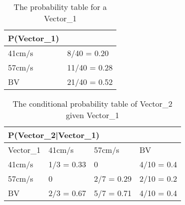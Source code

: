 \begin{table}[H]
\centering
\begin{tabular}{|l|l|}
\hline
P(Vector\_1) &\\ \hline
41cm/s & 8/40 = 0.20   \\ \hline 
57cm/s & 11/40 = 0.28  \\ \hline
BV & 21/40 = 0.52  \\ \hline
\end{tabular}
\caption{The probability table for a Vector\_1}
\label{Vector0Table}
\end{table}

\begin{table}[]
\centering
\begin{tabular}{|l|l|l|l|}
\hline
\multicolumn{4}{|l|}{P(Vector\_2|Vector\_1)} \\ \hline
 Vector\_1 & 41cm/s    & 57cm/s    & BV    \\ \hline
 41cm/s    & 1/3 = 0.33 & 0     & 4/10 = 0.4    \\ \hline
 57cm/s    & 0          & 2/7 = 0.29 & 2/10 = 0.2  \\ \hline
 BV        & 2/3 = 0.67 & 5/7 = 0.71 & 4/10 = 0.4  \\ \hline
\end{tabular}
\caption{The conditional probability table of Vector\_2 given Vector\_1}
\label{vector2tab}
\end{table}

